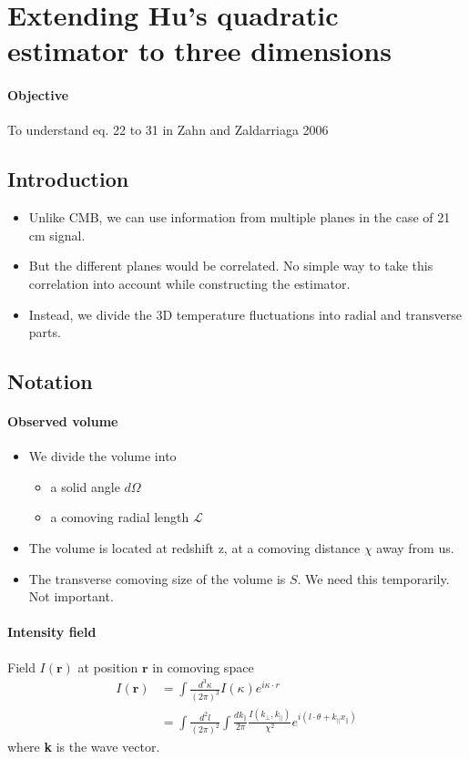 \documentclass[12pt]{article}
\newcommand{\beq}{\begin{equation}}
\newcommand{\eeq}{\end{equation}}
\newcommand{\beqal}{\begin{aligned}}
\newcommand{\eeqal}{\end{aligned}}
\numberwithin{equation}{section}
\begin{document}
\tableofcontents
\pagebreak

\section{Extending Hu's quadratic estimator to three dimensions}
\paragraph{Objective} To understand eq. 22 to 31 in Zahn and Zaldarriaga 2006

\subsection{Introduction}
\begin{itemize}
	\item Unlike CMB, we can use information from multiple planes in the case of 21 cm signal.
	\item But the different planes would be correlated. No simple way to take this correlation into account while constructing the estimator.
	\item Instead, we divide the 3D temperature fluctuations into radial and transverse parts.
\end{itemize}

\subsection{Notation}
\paragraph{Observed volume}
\begin{itemize}
	\item We divide the volume into
		\begin{itemize}
			\item a solid angle $ d\Omega $
			\item a comoving radial length $ \mathcal{L} $
		\end{itemize}
	\item The volume is located at redshift z, at a comoving distance $ \chi $ away from us.
	\item The transverse comoving size of the volume is $ S $. We need this temporarily. Not important.
\end{itemize}

\paragraph{Intensity field}
Field $ I(\textbf{r}) $ at position $ \textbf{r} $ in comoving space
\beq
\beqal
I(\textbf{r}) &= \int \frac{d^3\kappa}{(2\pi)^3} I(\kappa) e^{i \kappa \cdot r}
\\
&= \int \frac{d^2l}{(2\pi)^2} \int \frac{dk_{\parallel}}{2\pi} \frac{I(k_\perp, k_\parallel)}{\chi^2} e^{i(l\cdot \theta + k_\parallel x_\parallel)}
\eeqal
\eeq
where \textbf{k} is the wave vector.
\end{document}
